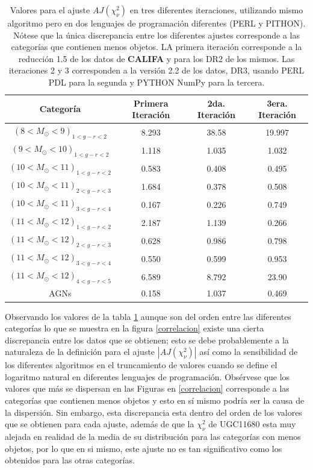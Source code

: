 \begin{table}[!ht]
\centering
\begin{tabular}{||c | c | c | c ||}
\hline
\hline
Categoría & Primera Iteración &  2da. Iteración & 3era. Iteración \\
\hline
\hline
$(8<M_{\odot}<9)_{1<g-r<2}$  &  8.293 &  38.58 &  19.997 \\
$(9<M_{\odot}<10)_{1<g-r<2}$ &  1.118 & 1.035 &  1.032 \\
$(10<M_{\odot}<11)_{1<g-r<2}$ & 0.583 & 0.408 & 0.495 \\
$(10<M_{\odot}<11)_{2<g-r<3}$ & 1.684 &  0.378 & 0.508\\
$(10<M_{\odot}<11)_{3<g-r<4} $ & 0.167 & 0.226 &  0.749 \\
$(11<M_{\odot}<12)_{1<g-r<2} $ & 2.187 &  1.139 &  0.266 \\
$(11<M_{\odot}<12)_{2<g-r<3} $  & 0.628 &  0.986 & 0.798  \\
$(11<M_{\odot}<12)_{3<g-r<4} $  & 0.550 &  0.599 & 0.953 \\
$(11<M_{\odot}<12)_{4<g-r<5}$ & 6.589 & 8.792 &  23.90 \\
                        AGNs  & 0.158 & 1.037  & 0.469\\
\hline
\hline
\end{tabular}
\caption{Valores para el ajuste $AJ(\chi^2_{\nu})$ en tres diferentes iteraciones, utilizando mismo algoritmo pero en dos lenguajes de programación diferentes (PERL y PITHON). Nótese que la única discrepancia entre los diferentes ajustes corresponde a las categorías que contienen menos objetos. LA primera iteración corresponde a la reducción 1.5 de los datos de \textbf{CALIFA} y para los DR2 de los mismos. Las iteraciones 2 y 3 corresponden a la versión 2.2 de los datos, DR3, usando PERL PDL para la segunda  y PYTHON NumPy para la tercera. }
\label{estadistica}
\end{table}

\bigskip

\noindent Observando los valores de la tabla \ref{estadistica} aunque son del orden entre las diferentes categorías lo que se muestra en la figura \ref{correlacion} existe una cierta discrepancia entre los datos que se obtienen; esto se debe probablemente a la naturaleza de la definición para el ajuste $|AJ(\chi^{2}_{\nu})|$ así como la sensibilidad de los diferentes algoritmos en el truncamiento de valores cuando se define el logaritmo natural en diferentes lenguajes de programación. Obsérvese que los valores que más se dispersan en las Figuras en \ref{correlacion} corresponde a las categorías que contienen menos objetos y esto en sí mismo podría ser la causa de la dispersión. Sin embargo, esta discrepancia esta dentro del orden de los valores que se obtienen para cada ajuste, además de que la $\chi^{2}_{\nu}$ de UGC11680 esta muy alejada en realidad de la media de su distribución para las categorías con menos objetos, por lo que en si mismo, este ajuste no es tan significativo como los obtenidos para las otras categorías.


